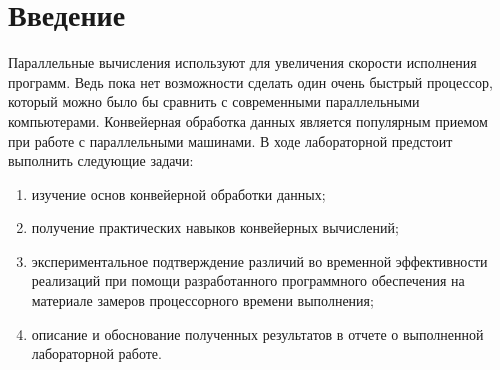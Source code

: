 \documentclass[a4paper, 12pt]{article}
\begin{document}
\tableofcontents
\clearpage
\newpage

\section*{Введение}

\begin{flushleft}
	\hspace*{5mm} Параллельные вычисления используют для увеличения скорости исполнения программ. Ведь пока нет возможности сделать один очень быстрый процессор, который можно было бы сравнить с современными параллельными компьютерами. Конвейерная обработка данных является популярным приемом при работе с параллельными машинами. 
	\newline \hspace*{5mm} В ходе лабораторной предстоит выполнить следующие задачи: 
	\begin{enumerate}
		\item изучение основ конвейерной обработки данных;
		\item получение практических навыков конвейерных вычислений;
		\item экспериментальное подтверждение различий во временной эффективности реализаций при помощи разработанного программного обеспечения на материале замеров процессорного времени выполнения;
		\item описание и обоснование полученных результатов в отчете о выполненной лабораторной работе.
	\end{enumerate}
	
\end{flushleft}
\clearpage
\newpage
\end{document}
